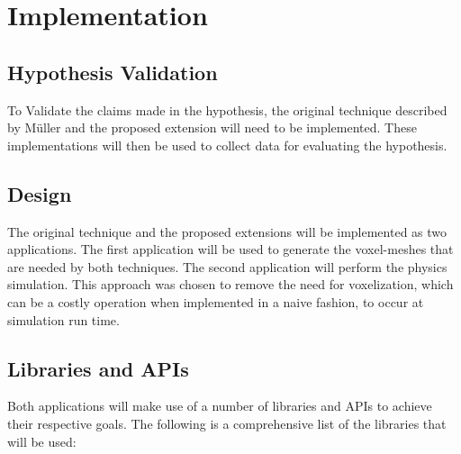 


\section{Implementation}
\subsection{Hypothesis Validation}

To Validate the claims made in the hypothesis, the original technique described by Müller \etal and
the proposed extension will need to be implemented. These implementations will then be used to 
collect data for evaluating the hypothesis.

\subsection{Design}

The original technique and the proposed extensions will be implemented as two applications. The 
first application will be used to generate the voxel-meshes that are needed by both techniques. The
second application will perform the physics simulation. This approach was chosen to remove the need
for voxelization, which can be a costly operation when implemented in a naive fashion, to occur at
simulation run time.

\subsection{Libraries and APIs}

Both applications will make use of a number of libraries and APIs to achieve their respective goals. 
The following is a comprehensive list of the libraries that will be used:

